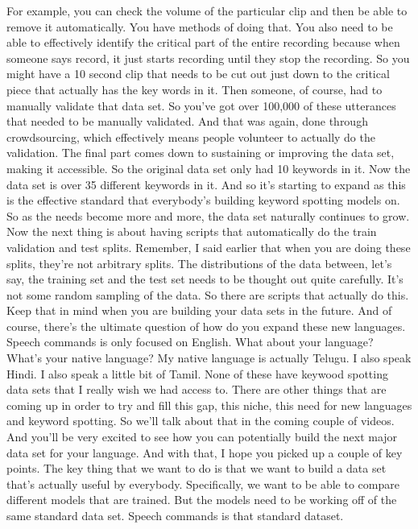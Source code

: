 For example, you can check the volume of the particular clip
and then be able to remove it automatically.
You have methods of doing that.
You also need to be able to effectively identify
the critical part of the entire recording
because when someone says record, it just
starts recording until they stop the recording.
So you might have a 10 second clip that needs
to be cut out just down to the critical piece that
actually has the key words in it.
Then someone, of course, had to manually validate that data set.
So you've got over 100,000 of these utterances that
needed to be manually validated.
And that was again, done through crowdsourcing,
which effectively means people volunteer to actually do the validation.
The final part comes down to sustaining or improving the data set,
making it accessible.
So the original data set only had 10 keywords in it.
Now the data set is over 35 different keywords in it.
And so it's starting to expand as this is
the effective standard that everybody's building keyword spotting models on.
So as the needs become more and more, the data set
naturally continues to grow.
Now the next thing is about having scripts that automatically do
the train validation and test splits.
Remember, I said earlier that when you are doing these splits,
they're not arbitrary splits.
The distributions of the data between, let's say,
the training set and the test set needs to be thought out quite carefully.
It's not some random sampling of the data.
So there are scripts that actually do this.
Keep that in mind when you are building your data sets in the future.
And of course, there's the ultimate question
of how do you expand these new languages.
Speech commands is only focused on English.
What about your language?
What's your native language?
My native language is actually Telugu.
I also speak Hindi.
I also speak a little bit of Tamil.
None of these have keywood spotting data sets
that I really wish we had access to.
There are other things that are coming up
in order to try and fill this gap, this niche, this need
for new languages and keyword spotting.
So we'll talk about that in the coming couple of videos.
And you'll be very excited to see how you can potentially
build the next major data set for your language.
And with that, I hope you picked up a couple of key points.
The key thing that we want to do is that we
want to build a data set that's actually useful by everybody.
Specifically, we want to be able to compare
different models that are trained.
But the models need to be working off of the same standard data set.
Speech commands is that standard dataset.
